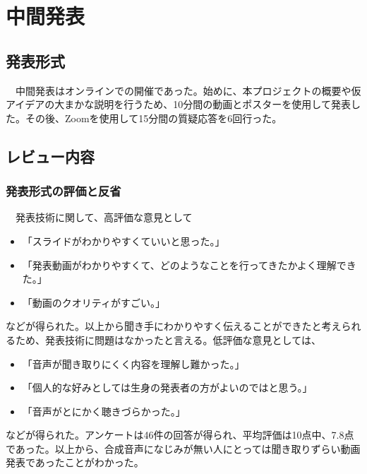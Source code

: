 \chapter{中間発表}

\section{発表形式}
　中間発表はオンラインでの開催であった。始めに、本プロジェクトの概要や仮アイデアの大まかな説明を行うため、10分間の動画とポスターを使用して発表した。その後、Zoomを使用して15分間の質疑応答を6回行った。

\section{レビュー内容}
\subsection{発表形式の評価と反省}
　発表技術に関して、高評価な意見として
\begin{itemize}
    \item 「スライドがわかりやすくていいと思った。」
    \item 「発表動画がわかりやすくて、どのようなことを行ってきたかよく理解できた。」
    \item 「動画のクオリティがすごい。」
\end{itemize}
などが得られた。以上から聞き手にわかりやすく伝えることができたと考えられるため、発表技術に問題はなかったと言える。低評価な意見としては、
\begin{itemize}
    \item 「音声が聞き取りにくく内容を理解し難かった。」
    \item 「個人的な好みとしては生身の発表者の方がよいのではと思う。」
    \item 「音声がとにかく聴きづらかった。」
\end{itemize}
などが得られた。アンケートは46件の回答が得られ、平均評価は10点中、7.8点であった。以上から、合成音声になじみが無い人にとっては聞き取りずらい動画発表であったことがわかった。

